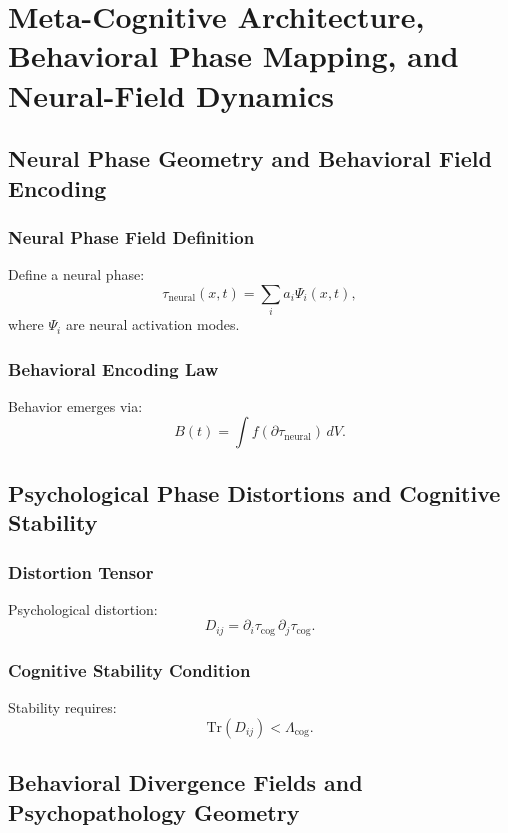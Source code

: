 

\part{Meta-Cognitive Architecture, Behavioral Phase Mapping, and Neural-Field Dynamics}

\chapter{Neural Phase Geometry and Behavioral Field Encoding}

\section{Neural Phase Field Definition}
Define a neural phase:
\[
\tau_{\mathrm{neural}}(x,t) = \sum_i a_i \Psi_i(x,t),
\]
where \(\Psi_i\) are neural activation modes.

\section{Behavioral Encoding Law}
Behavior emerges via:
\[
B(t) = \int f(\partial\tau_{\mathrm{neural}})\, dV.
\]

\chapter{Psychological Phase Distortions and Cognitive Stability}

\section{Distortion Tensor}
Psychological distortion:
\[
D_{ij} = \partial_i \tau_{\mathrm{cog}}\,\partial_j \tau_{\mathrm{cog}}.
\]

\section{Cognitive Stability Condition}
Stability requires:
\[
\mathrm{Tr}(D_{ij}) < \Lambda_{\mathrm{cog}}.
\]

\chapter{Behavioral Divergence Fields and Psychopathology Geometry}

